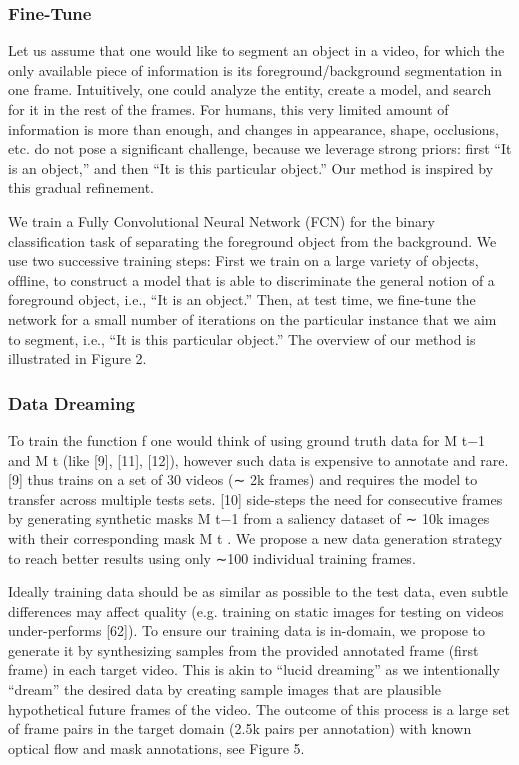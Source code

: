 \subsubsection{Fine-Tune}
Let us assume that one would like to segment an object in a video, for which the only available piece of information is its foreground/background segmentation in one frame. Intuitively, one could analyze the entity, create a model, and search for it in the rest of the frames. For humans, this very limited amount of information is more than enough, and changes in appearance, shape, occlusions, etc. do not pose a signiﬁcant challenge, because we leverage strong priors: ﬁrst “It is an object,” and then “It is this particular object.” Our method is inspired by this gradual reﬁnement.

We train a Fully Convolutional Neural Network (FCN) for the binary classiﬁcation task of separating the foreground object from the background. We use two successive training steps: First we train on a large variety of objects, ofﬂine, to construct a model that is able to discriminate the general notion of a foreground object, i.e., “It is an object.” Then, at test time, we ﬁne-tune the network for a small number of iterations on the particular instance that we aim to segment, i.e., “It is this particular object.” The overview of our method is illustrated in Figure 2.

\subsubsection{Data Dreaming}
To train the function f one would think of using ground truth data for M t−1 and M t (like [9], [11], [12]), however such data is expensive to annotate and rare. [9] thus trains on a set of 30 videos (∼ 2k frames) and requires the model to transfer across multiple tests sets. [10] side-steps the need for consecutive frames by generating synthetic masks M t−1 from a saliency dataset of ∼ 10k images with their corresponding mask M t . We propose a new data generation strategy to reach better results using only ∼100 individual training frames.

Ideally training data should be as similar as possible to the test data, even subtle differences may affect quality (e.g. training on static images for testing on videos under-performs [62]). To ensure our training data is in-domain, we propose to generate it by synthesizing samples from the provided annotated frame (ﬁrst frame) in each target video. This is akin to “lucid dreaming” as we intentionally “dream” the desired data by creating sample images that are plausible hypothetical future frames of the video. The outcome of this process is a large set of frame pairs in the target domain (2.5k pairs per annotation) with known optical ﬂow and mask annotations, see Figure 5.

